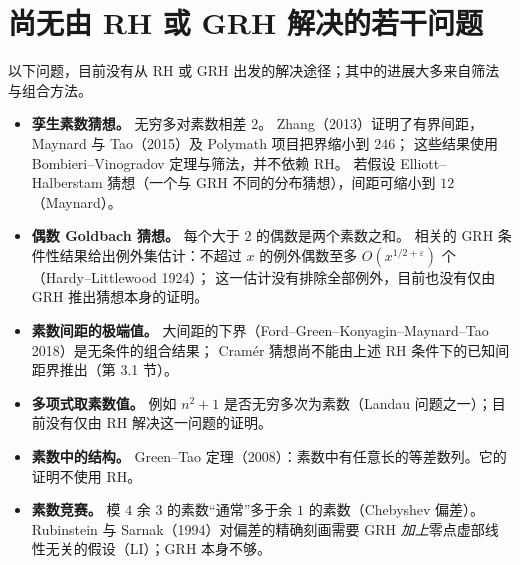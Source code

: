 \documentclass[11pt]{article}
\begin{document}
\section{尚无由 RH 或 GRH 解决的若干问题}
以下问题，目前没有从 RH 或 GRH 出发的解决途径；其中的进展大多来自筛法与组合方法。
\begin{itemize}
 \item \textbf{孪生素数猜想。} 无穷多对素数相差 $2$。
 Zhang（2013）证明了有界间距，Maynard 与 Tao（2015）及 Polymath 项目把界缩小到 $246$；
 这些结果使用 Bombieri--Vinogradov 定理与筛法，并不依赖 RH。
 若假设 Elliott--Halberstam 猜想（一个与 GRH 不同的分布猜想），间距可缩小到 $12$（Maynard）。
 \item \textbf{偶数 Goldbach 猜想。} 每个大于 $2$ 的偶数是两个素数之和。
 相关的 GRH 条件性结果给出例外集估计：不超过 $x$ 的例外偶数至多 $O(x^{1/2+\varepsilon})$ 个（Hardy--Littlewood 1924）；
 这一估计没有排除全部例外，目前也没有仅由 GRH 推出猜想本身的证明。
 \item \textbf{素数间距的极端值。} 大间距的下界（Ford--Green--Konyagin--Maynard--Tao 2018）是无条件的组合结果；
 Cramér 猜想尚不能由上述 RH 条件下的已知间距界推出（第 3.1 节）。
 \item \textbf{多项式取素数值。} 例如 $n^2+1$ 是否无穷多次为素数（Landau 问题之一）；目前没有仅由 RH 解决这一问题的证明。
 \item \textbf{素数中的结构。} Green--Tao 定理（2008）：素数中有任意长的等差数列。它的证明不使用 RH。
 \item \textbf{素数竞赛。} 模 $4$ 余 $3$ 的素数“通常”多于余 $1$ 的素数（Chebyshev 偏差）。
 Rubinstein 与 Sarnak（1994）对偏差的精确刻画需要 GRH \emph{加上}零点虚部线性无关的假设（LI）；GRH 本身不够。
\end{itemize}
\end{document}
